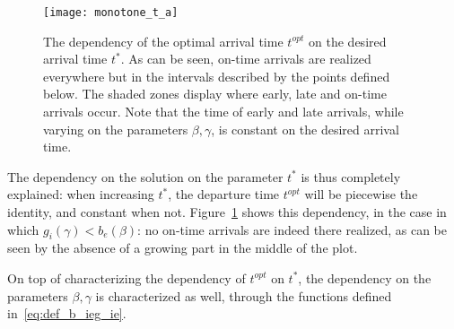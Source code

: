 \begin{figure}
  \centering
  \texttt{[image: monotone\_t\_a]}
  \caption{The dependency of the optimal arrival time \(t^{opt}\) on the desired arrival time \(t^*\).
    As can be seen, on-time arrivals are realized everywhere but in the intervals described by the points defined below.
    The shaded zones display where early, late and on-time arrivals occur.
    Note that the time of early and late arrivals, while varying on the parameters \(\beta, \gamma\),
  is constant on the desired arrival time.}
  \label{fig:t_opt_on_star}
\end{figure}

The dependency on the solution on the parameter \(t^*\) is thus completely explained:
when increasing \(t^*\), the departure time \(t^{opt}\) will be piecewise the identity,
and constant when not.
Figure~\ref{fig:t_opt_on_star} shows this dependency, in the case in which \(g_i(\gamma) < b_e(\beta)\):
no on-time arrivals are indeed there realized, as can be seen by the absence of a growing part in the middle of the plot.

On top of characterizing the dependency of \(t^{opt}\) on \(t^*\),
the dependency on the parameters \(\beta, \gamma\) is characterized as well, through the functions defined in~\eqref{eq:def_b_ieg_ie}.

